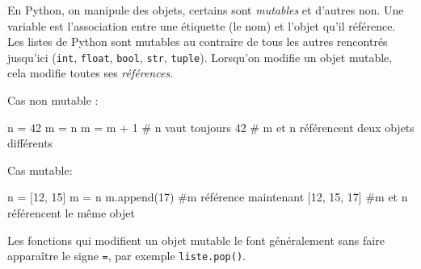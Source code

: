 \documentclass[11pt,a4paper]{article}
\begin{document}
	
	\begin{tcolorbox}[left=0cm,title=\bf{\faPython \; Mutables et non mutables},colbacktitle=cfond]
		En Python, on manipule des objets, certains sont \textit{mutables} et d'autres non. Une variable est l'association entre une étiquette (le nom) et l'objet qu'il référence. Les listes de Python sont mutables au contraire de tous les autres rencontrés jusqu'ici ({\tt int}, {\tt float}, {\tt bool}, {\tt str}, {\tt tuple}). Lorsqu'on modifie un objet mutable, cela modifie toutes ses \textit{références}.
			
		\setlength{\multicolsep}{0pt}
		\begin{multicols}{2}
			Cas non mutable :
			\begin{python}
	n = 42
	m = n
	m = m + 1
	# n vaut toujours 42
	# m et n référencent deux objets différents
	\end{python}
			Cas mutable: 
			\begin{python} 
	n = [12, 15]
	m = n
	m.append(17)
	#m référence maintenant [12, 15, 17]
	#m et n référencent le même objet
			\end{python}
		\end{multicols}
		Les fonctions qui modifient un objet mutable le font généralement sans faire apparaître le signe {\tt =}, par exemple \texttt{liste.pop()}.
	\end{tcolorbox}
\end{document}
